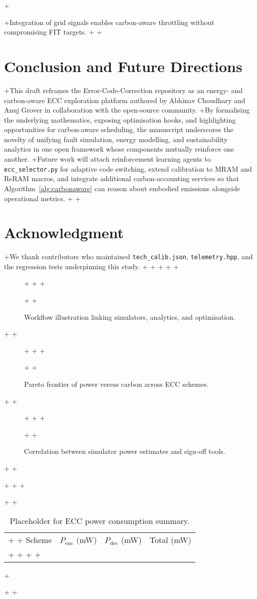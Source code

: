 +\documentclass[conference]{IEEEtran}
\begin{document}
+Integration of grid signals enables carbon-aware throttling without compromising FIT targets.
+
+\section{Conclusion and Future Directions}
+This draft reframes the Error-Code-Correction repository as an energy- and carbon-aware ECC exploration platform authored by Abhinav Choudhary and Anuj Grover in collaboration with the open-source community.
+By formalising the underlying mathematics, exposing optimisation hooks, and highlighting opportunities for carbon-aware scheduling, the manuscript underscores the novelty of unifying fault simulation, energy modelling, and sustainability analytics in one open framework whose components mutually reinforce one another.
+Future work will attach reinforcement learning agents to \texttt{ecc\_selector.py} for adaptive code switching, extend calibration to MRAM and ReRAM macros, and integrate additional carbon-accounting services so that Algorithm~\ref{alg:carbonaware} can reason about embodied emissions alongside operational metrics.
+
+\section*{Acknowledgment}
+We thank contributors who maintained \texttt{tech\_calib.json}, \texttt{telemetry.hpp}, and the regression tests underpinning this study.
+
+
+
+
+\begin{figure*}[!t]
+    \centering
+    %
+    \caption{Workflow illustration linking simulators, analytics, and optimisation.}
+    \label{fig:workflow}
+\end{figure*}
+
+\begin{figure}[!t]
+    \centering
+    %
+    \caption{Pareto frontier of power versus carbon across ECC schemes.}
+    \label{fig:pareto}
+\end{figure}
+
+\begin{figure}[!t]
+    \centering
+    %
+    \caption{Correlation between simulator power estimates and sign-off tools.}
+    \label{fig:correlation}
+\end{figure}
+
+\begin{table}[!t]
+    \centering
+    %
+    \caption{Placeholder for ECC power consumption summary.}
+    \label{tab:power}
+    \begin{tabular}{@{}lccc@{}}
+        \toprule
+        Scheme & $P_{\text{enc}}$ (mW) & $P_{\text{dec}}$ (mW) & Total (mW) \\
+        \midrule
+        %
+        \bottomrule
+    \end{tabular}
+\end{table}
+
+
\end{document}
